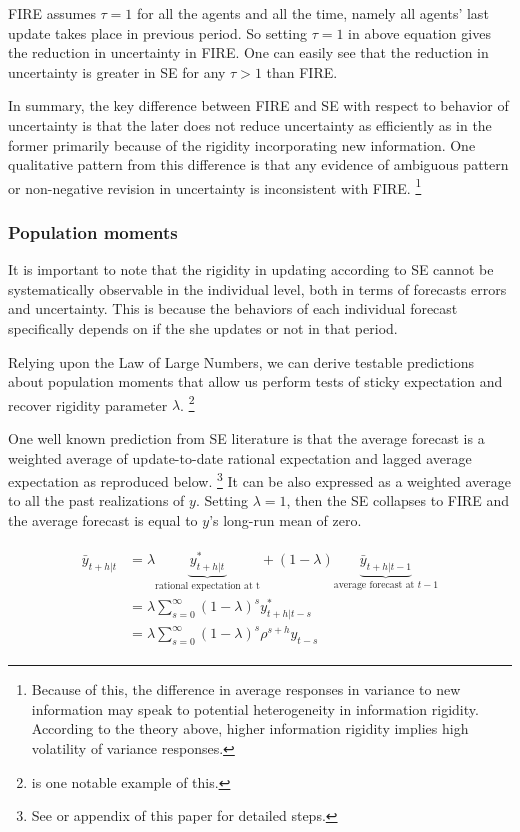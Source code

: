 \documentclass[]{article}
\begin{document}
	FIRE assumes  $\tau=1$ for all the agents and all the time, namely all agents' last update takes place in previous period. So setting $\tau =1$ in above equation gives the reduction in uncertainty in FIRE. One can easily see that the reduction in uncertainty is greater in SE for any $\tau>1$ than FIRE.
	
	In summary, the key difference between FIRE and SE with respect to behavior of uncertainty is that the later does not reduce uncertainty  as efficiently as in the former primarily because of the rigidity incorporating new information.  One qualitative pattern from this difference is that any evidence of ambiguous pattern  or non-negative revision in uncertainty is inconsistent with FIRE. \footnote{Because of this, the difference in average responses in variance to new information may speak to potential heterogeneity in information rigidity. According to the theory above, higher information rigidity implies high volatility of variance responses.  }
	
	
	
	\subsubsection{Population moments} 
	
	It is important to note that the rigidity in updating according to SE cannot be systematically observable in the individual level, both in terms of forecasts errors and uncertainty. This is because the behaviors of each individual forecast specifically depends on if the she updates or not in that period. 
	
	Relying upon the Law of Large Numbers, we can derive testable predictions about population moments that allow us perform tests of sticky expectation and recover rigidity parameter $\lambda$. \footnote{\citet{carroll2003macroeconomic} is one notable example of this.} 
	
	
	One well known prediction from SE literature is that the average forecast is a weighted average of update-to-date rational expectation and lagged average expectation as reproduced below. \footnote{See \citet{coibion2012can} or appendix of this paper for detailed steps.} It can be also expressed as a weighted average to all the past realizations of $y$. Setting $\lambda=1$, then the SE collapses to FIRE and the average forecast is equal to $y$'s long-run mean of zero.
	
	\begin{eqnarray}
		\begin{aligned}
			\bar y_{t+h|t} & = \lambda \underbrace{y^*_{t+h|t}}_{\textrm{rational expectation at t}} + (1-\lambda) \underbrace{\bar y_{t+h|t-1}}_{\textrm{average forecast at } t-1} \\
			& = \lambda \sum^{\infty}_{s=0} (1-\lambda)^s y^*_{t+h|t-s} \\
			& = \lambda \sum^{\infty}_{s=0} (1-\lambda)^s \rho^{s+h}y_{t-s}
		\end{aligned}
	\end{eqnarray}
	
\end{document}
